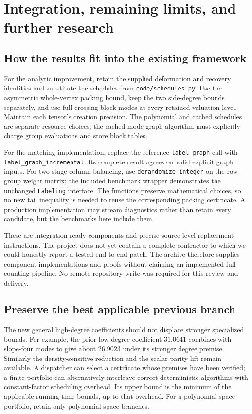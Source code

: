 \section{Integration, remaining limits, and further research}\label{sec:integration}
\subsection{How the results fit into the existing framework}
For the analytic improvement, retain the supplied deformation and recovery
identities and substitute the schedules from \texttt{code/schedules.py}.
Use the asymmetric whole-vertex packing bound, keep the two side-degree
bounds separately, and use full crossing-block modes at every retained
valuation level. Maintain each tensor's creation precision. The polynomial
and cached schedules are separate resource choices; the cached mode-graph
algorithm must explicitly charge group evaluations and store block tables.

For the matching implementation, replace the reference
\texttt{label\_graph} call with \texttt{label\_graph\_\allowbreak incremental}.
Its complete result agrees on valid explicit graph inputs. For two-stage
column balancing, use \texttt{derandomize\_\allowbreak integer} on the row-group weight
matrix; the included benchmark wrapper demonstrates the unchanged
\texttt{Labeling} interface. The functions preserve mathematical choices,
so no new tail inequality is needed to reuse the corresponding packing
certificate. A production implementation may stream diagnostics rather than
retain every candidate, but the benchmarks here include them.

These are integration-ready components and precise source-level replacement
instructions. The project does not yet contain a complete contractor to which
we could honestly report a tested end-to-end patch. The archive therefore
supplies component implementations and proofs without claiming an implemented
full counting pipeline. No remote repository write was required for this
review and delivery.

\subsection{Preserve the best applicable previous branch}
The new general high-degree coefficients should not displace stronger
specialized bounds. For example, the prior low-degree coefficient
$31.0641$ combines with slope-four modes to give about $26.9023$ under its
stronger degree premise. Similarly the density-sensitive reduction and the
scalar parity lift remain available. A dispatcher can select a certificate
whose premises have been verified; a finite portfolio can alternatively
interleave correct deterministic algorithms with constant-factor scheduling
overhead. Its upper bound is the minimum of the applicable running-time
bounds, up to that overhead. For a polynomial-space portfolio, retain only
polynomial-space branches.

